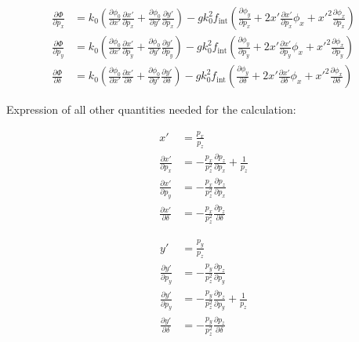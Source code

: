 \begin{align}
\frac{\partial \Phi}{\partial p_x} &= 
k_0 \left( \frac{\partial \phi_0}{\partial x'}\frac{\partial x'}{\partial p_x} + \frac{\partial \phi_0}{\partial y'}\frac{\partial y'}{\partial p_x} \right)
-g k_0^2 f_\text{int} \left(
\frac{\partial \phi_y}{\partial p_x}
+ 2x'\frac{\partial x'}{\partial p_x}\phi_x
+x'^2 
\frac{\partial \phi_x}{\partial p_x}
\right)\\
%
\frac{\partial \Phi}{\partial p_y} &= 
k_0 \left( \frac{\partial \phi_0}{\partial x'}\frac{\partial x'}{\partial p_y} + \frac{\partial \phi_0}{\partial y'}\frac{\partial y'}{\partial p_y} \right)
-g k_0^2 f_\text{int} \left(
\frac{\partial \phi_y}{\partial p_y}
+ 2x'\frac{\partial x'}{\partial p_y}\phi_x
+x'^2 
\frac{\partial \phi_x}{\partial p_y}
\right)\\
%
\frac{\partial \Phi}{\partial \delta} &= 
k_0 \left( \frac{\partial \phi_0}{\partial x'}\frac{\partial x'}{\partial \delta} + \frac{\partial \phi_0}{\partial y'}\frac{\partial y'}{\partial \delta} \right)
-g k_0^2 f_\text{int} \left(
\frac{\partial \phi_y}{\partial \delta} 
+ 2x'\frac{\partial x'}{\partial \delta}\phi_x
+x'^2 
\frac{\partial \phi_x}{\partial \delta} 
\right)
\end{align}

Expression of all other quantities needed for the calculation:


\begin{align}
x' &= \frac{p_x}{p_z}\\
\frac{\partial x'}{\partial p_x} &= - \frac{p_x}{p_z^2}\frac{\partial p_z}{\partial p_x} + \frac{1}{p_z} \\
\frac{\partial x'}{\partial p_y} &= - \frac{p_x}{p_z^2}\frac{\partial p_z}{\partial p_x}\\
\frac{\partial x'}{\partial \delta} &= - \frac{p_x}{p_z^2}\frac{\partial p_z}{\partial \delta}
\end{align}

\begin{align}
y' &= \frac{p_y}{p_z}\\
\frac{\partial y'}{\partial p_y} &= - \frac{p_y}{p_z^2}\frac{\partial p_z}{\partial p_y}  \\
\frac{\partial y'}{\partial p_y} &= - \frac{p_y}{p_z^2}\frac{\partial p_z}{\partial p_y} + \frac{1}{p_z}\\
\frac{\partial y'}{\partial \delta} &= - \frac{p_y}{p_z^2}\frac{\partial p_z}{\partial \delta}
\end{align}


